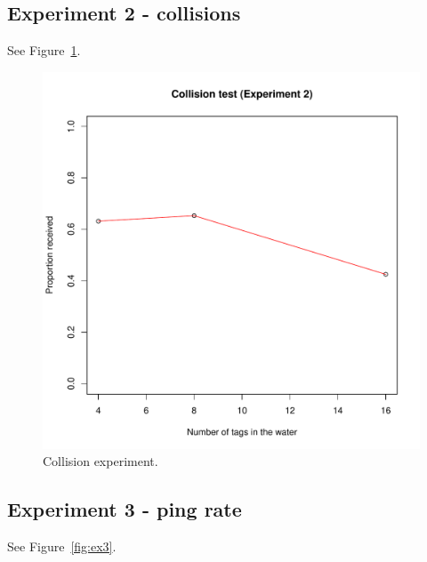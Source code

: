 \documentclass{article}
\begin{document}
\subsection{Experiment 2 - collisions}

See Figure~\ref{fig:ex2}.

\begin{figure}
  \begin{center}
    \includegraphics[trim=0cm 0cm 0cm 0cm,clip,angle=0,width=1\textwidth]{experiment2/collresult.pdf}
  \end{center}
  \caption{Collision experiment.}
\label{fig:ex2}
\end{figure}

\subsection{Experiment 3 - ping rate}

See Figure~\ref{fig:ex3}.
\end{document}
